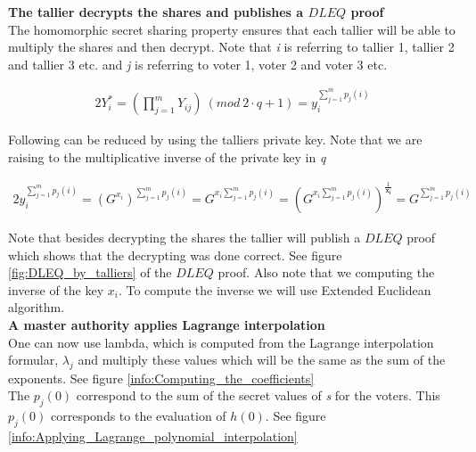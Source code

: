\noindent
\textbf{The tallier decrypts the shares and publishes a $DLEQ$ proof}\\
The homomorphic secret sharing property ensures that each tallier will  be able to multiply the shares and then decrypt. Note that \textit{i} is referring to tallier 1, tallier  2 and tallier 3 etc. and \textit{j} is referring to voter 1, voter 2 and voter 3 etc.

\begin{alignat*}{2}
Y_i^*=(\prod\limits_{j=1}^{m} Y_{ij}) \ (mod\ 2 \cdot q+1) =y_i^{\sum\limits_{j=1}^m p_j(i)}
\end{alignat*}


\noindent
Following can be reduced by using the talliers private key. Note that we are raising to the multiplicative inverse of the private key in  \textit{q}


\begin{alignat*}{2}
y_i^{\sum\limits_{j=1}^m p_j(i)}=(G^{x_i})^{\sum\limits_{j=1}^m p_j(i)} = G^{x_i \sum\limits_{j=1}^m p_j(i)}= (G^{x_i \sum\limits_{j=1}^m p_j(i)})^{\frac{1}{\mathbf{x_i}}}= G^{ \sum\limits_{j=1}^m p_j(i)}
\end{alignat*}


\noindent
Note that besides decrypting the shares the tallier will publish a $DLEQ$ proof which shows that the decrypting was done correct. See figure \ref{fig:DLEQ_by_talliers} of the $DLEQ$ proof. Also note that we computing the inverse of the key $x_i$. To compute the inverse we will use Extended Euclidean algorithm.\\


\noindent
\textbf{A master authority applies Lagrange interpolation}\\
One can now use lambda, which is computed from the  Lagrange interpolation formular, \begin{math} \lambda_j \end{math} and multiply these values which will be the same as the sum of the exponents. See figure \ref{info:Computing_the_coefficients} \\

\noindent
The \begin{math}p_j(0) \end{math} correspond to the sum of the secret values of \textit{s} for the voters. This \begin{math}p_j(0)\end{math} corresponds to the evaluation of \begin{math}h(0)\end{math}. See figure  \ref{info:Applying_Lagrange_polynomial_interpolation}


